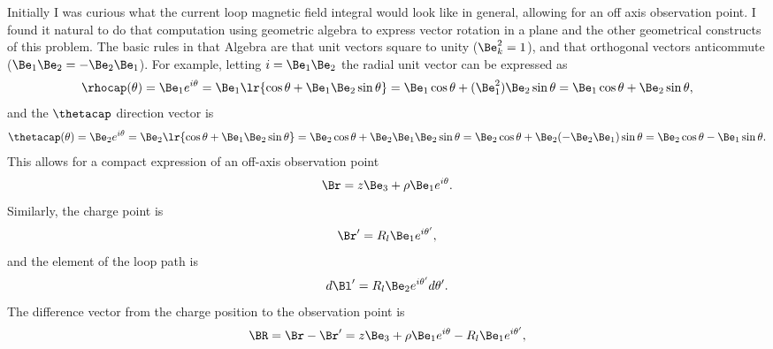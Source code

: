 %
%
%
Initially I was curious what the current loop magnetic field integral would look like in general, allowing for an off axis observation point.
%
I found it natural to do that computation using geometric algebra to express vector rotation in a plane and the other geometrical constructs of this problem.  The basic rules in that Algebra are that unit vectors square to unity (\(\Be_k^2 = 1 \)), and that orthogonal vectors anticommute (\( \Be_1 \Be_2 = -\Be_2 \Be_1 \)).  For example, letting \( i = \Be_1 \Be_2 \) the radial unit vector can be expressed as
%
\begin{dmath}\label{eqn:emtProblemSet3Problem2:160}
\rhocap(\theta)
=
\Be_1 e^{i \theta}
= \Be_1 \lr{ \cos\theta + \Be_1 \Be_2 \sin\theta }
= \Be_1 \cos\theta + (\Be_1^2) \Be_2 \sin\theta
= \Be_1 \cos\theta + \Be_2 \sin\theta,
\end{dmath}
%
and the \( \thetacap \) direction vector is
\begin{dmath}\label{eqn:emtProblemSet3Appendix:240}
\thetacap(\theta)
=
\Be_2 e^{i \theta}
= \Be_2 \lr{ \cos\theta + \Be_1 \Be_2 \sin\theta }
= \Be_2 \cos\theta + \Be_2 \Be_1 \Be_2 \sin\theta
= \Be_2 \cos\theta + \Be_2 (-\Be_2 \Be_1) \sin\theta
= \Be_2 \cos\theta - \Be_1 \sin\theta.
\end{dmath}
%
This allows for a compact expression of an off-axis observation point
%
\begin{dmath}\label{eqn:emtProblemSet3Problem2:60}
\Br = z \Be_3 + \rho \Be_1 e^{i\theta}.
\end{dmath}
%
Similarly, the charge point is
\begin{dmath}\label{eqn:emtProblemSet3Problem2:80}
\Br' = R_l \Be_1 e^{i \theta'},
\end{dmath}
%
and the element of the loop path is
\begin{dmath}\label{eqn:emtProblemSet3Problem2:100}
d\Bl' = R_l \Be_2 e^{i\theta'} d\theta'.
\end{dmath}
%
The difference vector from the charge position to the observation point is
%
\begin{dmath}\label{eqn:emtProblemSet3Problem2:120}
\BR
= \Br - \Br'
=
z \Be_3 + \rho \Be_1 e^{i\theta}
-
R_l \Be_1 e^{i \theta'},
\end{dmath}
